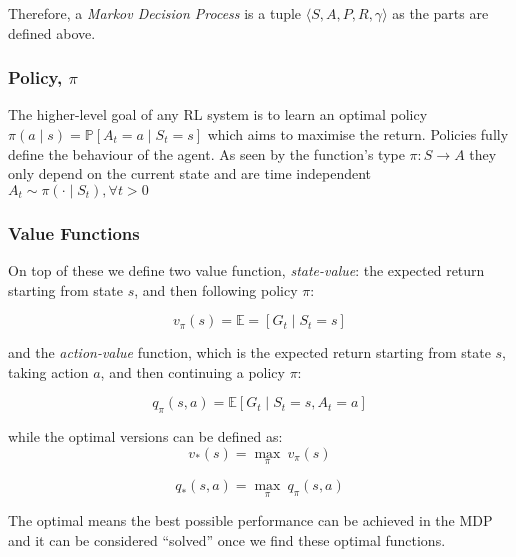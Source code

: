     Therefore, a \emph{Markov Decision Process} is a tuple \(\langle S, A, P, R, \gamma \rangle\) as the parts are defined above.
    
    
  \subsubsection{Policy, $\pi$}
    The higher-level goal of any RL system is to learn an optimal policy \(\pi \left( a \mid s\right) = \mathbb{P} \left[A_t = a \mid S_t = s\right]\) which aims to maximise the return. Policies fully define the behaviour of the agent. As seen by the function's type \(\pi: S \rightarrow A \) they only depend on the current state and are time independent \( A_t \sim \pi\left( \cdot \mid S_t\right), \forall t > 0 \)
    
  \subsubsection{Value Functions}
    On top of these we define two value function, \emph{state-value}: the expected return starting from state $s$, and then following policy $\pi$:

    \[ v_\pi \left(s\right) = \mathbb{E} = \left[G_t \mid S_t = s\right]\]

    and the \emph{action-value} function, which is the expected return starting from state $s$, taking action $a$, and then continuing a policy $\pi$:

    \[ q_\pi \left(s, a\right) = \mathbb{E} \left[ G_t \mid S_t = s, A_t = a\right]\]


    while the optimal versions can be defined as:
    \[v_* \left(s\right) = \underset{\pi}{\max} \ v_\pi \left(s\right)\]

    \[q_* \left(s, a\right) = \underset{\pi}{\max} \ q_\pi \left(s, a\right)\]
    
    The optimal means the best possible performance can be achieved in the MDP and it can be considered ``solved'' once we find these optimal functions.


    
